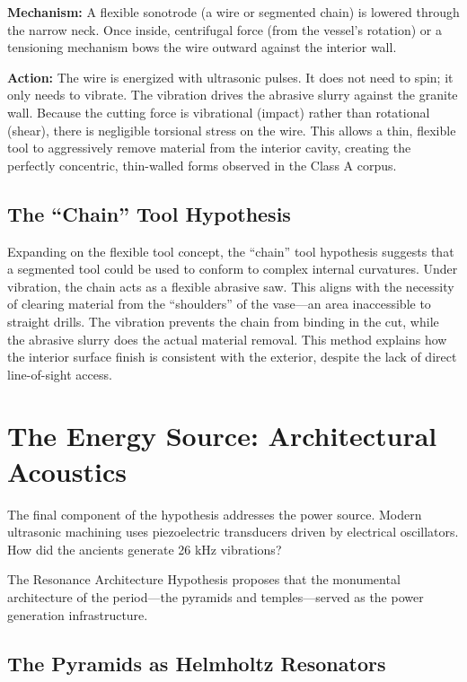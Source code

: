 \documentclass[11pt]{article}
\begin{document}
\textbf{Mechanism:} A flexible sonotrode (a wire or segmented chain) is lowered through the narrow neck. Once inside, centrifugal force (from the vessel's rotation) or a tensioning mechanism bows the wire outward against the interior wall.

\textbf{Action:} The wire is energized with ultrasonic pulses. It does not need to spin; it only needs to vibrate. The vibration drives the abrasive slurry against the granite wall. Because the cutting force is vibrational (impact) rather than rotational (shear), there is negligible torsional stress on the wire. This allows a thin, flexible tool to aggressively remove material from the interior cavity, creating the perfectly concentric, thin-walled forms observed in the Class A corpus.

\subsection{The ``Chain'' Tool Hypothesis}

Expanding on the flexible tool concept, the ``chain'' tool hypothesis suggests that a segmented tool could be used to conform to complex internal curvatures. Under vibration, the chain acts as a flexible abrasive saw. This aligns with the necessity of clearing material from the ``shoulders'' of the vase---an area inaccessible to straight drills. The vibration prevents the chain from binding in the cut, while the abrasive slurry does the actual material removal. This method explains how the interior surface finish is consistent with the exterior, despite the lack of direct line-of-sight access.

\section{The Energy Source: Architectural Acoustics}

The final component of the hypothesis addresses the power source. Modern ultrasonic machining uses piezoelectric transducers driven by electrical oscillators. How did the ancients generate 26 kHz vibrations?

The Resonance Architecture Hypothesis proposes that the monumental architecture of the period---the pyramids and temples---served as the power generation infrastructure.

\subsection{The Pyramids as Helmholtz Resonators}
\end{document}
